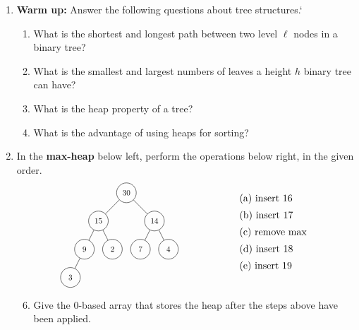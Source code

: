 \documentclass[a4paper,12pt]{article}
\begin{document}
\begin{enumerate}

\item \textbf{Warm up:} Answer the following questions about tree structures.`
\begin{enumerate}
\item What is the shortest and longest path between two level $\ell$ nodes in a binary tree?
\item What is the smallest and largest numbers of leaves a height $h$ binary tree can have?
\item What is the heap property of a tree?
\item What is the advantage of using heaps for sorting?
\end{enumerate}

\vfill
\item In the \textbf{max-heap} below left, perform the operations below right, in the given order.
\[
\begin{tikzpicture}[baseline=1.5cm]
\foreach \x\y\n\l in {.5/0/a/3, 1/1/b/9, 2/1/c/2, 3/1/d/7, 4/1/e/4, 1.5/2/f/15, 3.5/2/g/14, 2.5/3/h/30}{
  \node[circle,draw,minimum size=25pt,scale=.8] (\n) at (\x,\y) {\l};
}
\foreach \x\y in {a/b, b/f, c/f, d/g, e/g, f/h, g/h}{
  \draw (\x)--(\y);
}
\end{tikzpicture}
\hspace{2cm}
\begin{array}{l}
\text{(a) insert 16} \\[5pt]
\text{(b) insert 17} \\[5pt]
\text{(c) remove max} \\[5pt]
\text{(d) insert 18} \\[5pt]
\text{(e) insert 19}
\end{array}
\]
\begin{enumerate}\setcounter{enumii}{5}
\item Give the 0-based array that stores the heap after the steps above have been applied.
\end{enumerate}


\end{enumerate}
\end{document}
